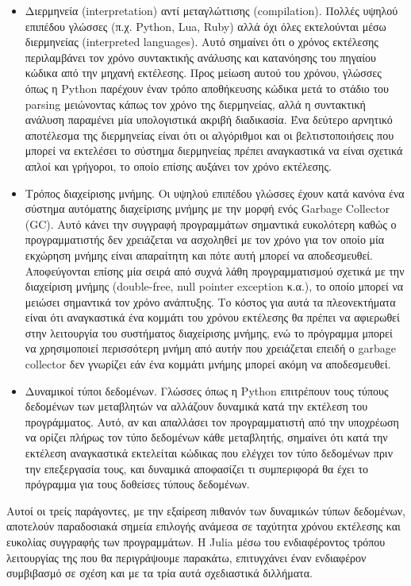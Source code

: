 \begin{itemize}
    \item Διερμηνεία (interpretation) αντί μεταγλώττισης (compilation).
        Πολλές υψηλού επιπέδου γλώσσες (π.χ. Python, Lua, Ruby) αλλά όχι όλες εκτελούνται μέσω διερμηνείας (interpreted languages).
        Αυτό σημαίνει ότι ο χρόνος εκτέλεσης περιλαμβάνει τον χρόνο συντακτικής ανάλυσης και κατανόησης του πηγαίου κώδικα από την μηχανή εκτέλεσης.
        Προς μείωση αυτού του χρόνου, γλώσσες όπως η Python παρέχουν έναν τρόπο αποθήκευσης κώδικα μετά το στάδιο του parsing μειώνοντας κάπως τον χρόνο της διερμηνείας, αλλά η συντακτική ανάλυση παραμένει μία υπολογιστικά ακριβή διαδικασία.
        Ένα δεύτερο αρνητικό αποτέλεσμα της διερμηνείας είναι ότι οι αλγόριθμοι και οι βελτιστοποιήσεις που μπορεί να εκτελέσει το σύστημα διερμηνείας πρέπει αναγκαστικά να είναι σχετικά απλοί και γρήγοροι, το οποίο επίσης αυξάνει τον χρόνο εκτέλεσης.
    \item Τρόπος διαχείρισης μνήμης. Οι υψηλού επιπέδου γλώσσες έχουν κατά κανόνα ένα σύστημα αυτόματης διαχείρισης μνήμης με την μορφή ενός Garbage Collector (GC).
        Αυτό κάνει την συγγραφή προγραμμάτων σημαντικά ευκολότερη καθώς ο προγραμματιστής δεν χρειάζεται να ασχοληθεί με τον χρόνο για τον οποίο μία εκχώρηση μνήμης είναι απαραίτητη και πότε αυτή μπορεί να αποδεσμευθεί.
        Αποφεύγονται επίσης μία σειρά από συχνά λάθη προγραμματισμού σχετικά με την διαχείριση μνήμης (double-free, null pointer exception κ.α.), το οποίο μπορεί να μειώσει σημαντικά τον χρόνο ανάπτυξης.
        Το κόστος για αυτά τα πλεονεκτήματα είναι ότι αναγκαστικά ένα κομμάτι του χρόνου εκτέλεσης θα πρέπει να αφιερωθεί στην λειτουργία του συστήματος διαχείρισης μνήμης, ενώ το πρόγραμμα μπορεί να χρησιμοποιεί περισσότερη μνήμη από αυτήν που χρειάζεται επειδή ο garbage collector δεν γνωρίζει εάν ένα κομμάτι μνήμης μπορεί ακόμη να αποδεσμευθεί.
    \item Δυναμικοί τύποι δεδομένων.
        Γλώσσες όπως η Python επιτρέπουν τους τύπους δεδομένων των μεταβλητών να αλλάζουν δυναμικά κατά την εκτέλεση του προγράμματος.
        Αυτό, αν και απαλλάσει τον προγραμματιστή από την υποχρέωση να ορίζει πλήρως τον τύπο δεδομένων κάθε μεταβλητής, σημαίνει ότι κατά την εκτέλεση αναγκαστικά εκτελείται κώδικας που ελέγχει τον τύπο δεδομένων πριν την επεξεργασία τους, και δυναμικά αποφασίζει τι συμπεριφορά θα έχει το πρόγραμμα για τους δοθείσες τύπους δεδομένων.
\end{itemize}

Αυτοί οι τρείς παράγοντες, με την εξαίρεση πιθανόν των δυναμικών τύπων δεδομένων, αποτελούν παραδοσιακά σημεία επιλογής ανάμεσα σε ταχύτητα χρόνου εκτέλεσης και ευκολίας συγγραφής των προγραμμάτων.
Η Julia μέσω του ενδιαφέροντος τρόπου λειτουργίας της που θα περιγράψουμε παρακάτω, επιτυγχάνει έναν ενδιαφέρον συμβιβασμό σε σχέση και με τα τρία αυτά σχεδιαστικά διλλήματα.


